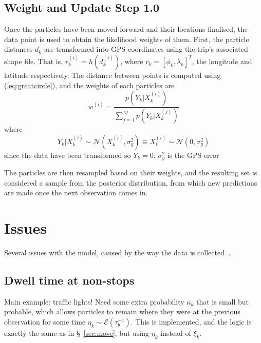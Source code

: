 \documentclass[10pt,a4paper]{article}
\begin{document}
\subsection{Weight and Update Step 1.0}
\label{sec:weight-update}

Once the particles have been moved forward and their locations finalised, the data point is used to 
obtain the likelihood weights of them.
First, the particle distances $d_k$ are transformed into GPS coordinates using the trip's associated 
shape file. 
That is, $r_k^{(i)} = h(d_k^{(i)})$, where $r_k = [\phi_k, \lambda_k]^T$, the longitude and latitude
respectively.
The distance between points is computed using (\ref{eq:greatcircle}), 
and the weights of each particles are
\begin{equation}
  \label{eq:particle_weights}
  w^{(i)} = \frac{p(Y_k | X_k^{(i)})}{\sum_{j=1}^M p(Y_k | X_k^{(j)})}
\end{equation}
where
\begin{equation}
  \label{eq:particle_lhood}
  Y_k | X_k^{(i)} \sim \mathcal{N}\left(X_k^{(i)}, \sigma_y^2\right) \equiv
  X_k^{(i)} \sim \mathcal{N}\left(0, \sigma_y^2\right)
\end{equation}
since the data have been transformed so $Y_k = 0$.
$\sigma_y^2$ is the GPS error

The particles are then resampled based on their weights, and the resulting set is considered
a sample from the posterior distribution, from which new predictions are made once the next 
observation comes in.



\section{Issues}

Several issues with the model, caused by the way the data is collected \ldots


\subsection{Dwell time at non-stops}

Main example: traffic lights! 
Need some extra probability $\kappa_k$ that is small but probable, 
which allows particles to remain where they were at the previous observation
for some time $\eta_k \sim \mathcal{E}(\tau_b^{-1})$.
This is implemented, and the logic is exactly the same as in \S~\ref{sec:move},
but using $\eta_k$ instead of $\xi_k$.
\end{document}
